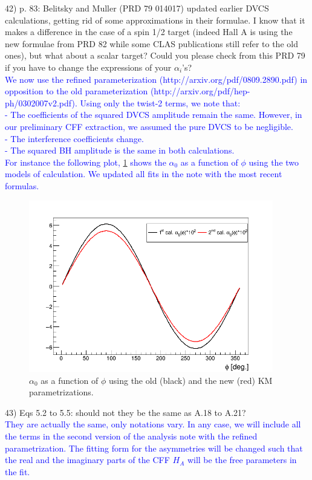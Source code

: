 42) p. 83: Belitsky and Muller (PRD 79 014017) updated earlier DVCS 
calculations, getting rid of some approximations in their formulae. I know that 
it makes a difference in the case of a spin 1/2 target (indeed Hall A is using 
the new formulae from PRD 82 while some CLAS publications still refer to the 
old ones), but what about a scalar target? Could you please check from this PRD 
79 if you have to change the expressions of your $\alpha_{i}$'s?\\
\textcolor{blue}{
We now use the  refined parameterization (http://arxiv.org/pdf/0809.2890.pdf)
in opposition to the old parameterization (http://arxiv.org/pdf/hep-ph/0302007v2.pdf).
  Using only the twist-2 terms, we note that:\\
  - The coefficients of the squared DVCS amplitude remain the same. However, in our 
preliminary CFF extraction, we assumed the pure DVCS to be negligible. \\
  - The interference coefficients change.\\
  - The squared BH amplitude is the same in both calculations.\\
For instance the following plot, \ref{fig:alpha_zero} shows the $\alpha_{0}$ as 
a function of $\phi$ using the two models of calculation.
We updated all fits in the note with the most recent formulas.} \\

\begin{figure}[tbp]
\centering
\includegraphics[height=7.5cm]{fig/alpha_0_two_models.png}
\caption{$\alpha_0$ as a function of $\phi$ using the old (black) and the new 
(red) KM parametrizations.}
\label{fig:alpha_zero}
 \end{figure}

43) Eqs 5.2 to 5.5: should not they be the same as A.18 to A.21? \\
\textcolor{blue}{ They are actually the same, only notations vary. In any case, 
we will include all the terms in 
the second version of the analysis note with the refined parametrization. The 
fitting form for the asymmetries will be changed such that the real and the 
imaginary parts of the CFF $H_A$ will be the free parameters in the fit.} \\

